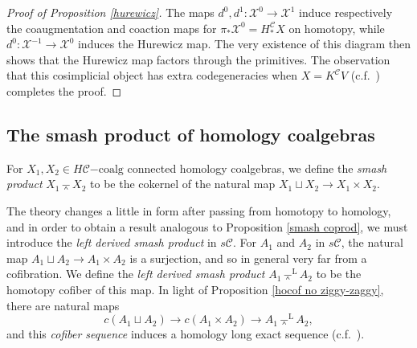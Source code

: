 \documentclass[11pt]{amsart} \renewcommand{\baselinestretch}{1.2}
\theoremstyle{plain}
\numberwithin{equation}{section} %
\theoremstyle{plain}
\numberwithin{equation}{chapter} %
\renewcommand{\to}{\longrightarrow}
\newcommand{\from}{\longleftarrow}
\newcommand{\calx}{\mathcal{X}}
\newcommand{\calc}{\mathcal{C}}
\newcommand{\citeBOX}[2][]{\cite[\mbox{#1}]{#2}}
\newcommand{\HC}[1]{H#1\mathrm{-coalg}}
\newcommand{\smashprod}{\barwedge}%
\newcommand{\Lsmashprod}{\barwedge^\mathrm{L}}%
\newcommand{\SubsectionOrSection}[1]{\subsection{#1}}
\begin{document}
\begin{Pi-algebras and cohomology algebras}
\begin{proof}[Proof of Proposition \ref{hurewicz}]
The maps $d^0,d^1:\calx^{0}\to\calx^{1}$ induce respectively the coaugmentation and coaction maps for $\pi_*\calx^{0}=H_*^{\calc}X$ on homotopy, while $d^0:\calx^{-1}\to\calx^{0}$ induces the Hurewicz map. The very existence of this diagram then shows that the  Hurewicz map factors through the primitives. The  observation   that this cosimplicial object has extra codegeneracies  when $X=K^\calc V$     (c.f.\ \citeBOX[\S4]{BlumRiehlResolutions.pdf}) completes the proof.
\end{proof}

\SubsectionOrSection{The smash product of homology coalgebras}\label{subseq:The smash product}
For $X_1,X_2\in \HC{\calc}$ connected homology coalgebras, we define the \emph{smash product} $X_1\smashprod X_2$ to be the cokernel of the natural map $X_1\sqcup X_2\to X_1\times X_2$. 

The theory changes a little in form after passing from homotopy to homology, and in order to obtain a result analogous to Proposition \ref{smash coprod}, we must introduce the \emph{left derived smash product} in $s\calc$. For $A_1$ and $A_2$ in $s\calc$, the natural map $A_1\sqcup A_2\to A_1\times A_2$ is a surjection, and so in general very far from a cofibration. We define the \emph{left derived smash product} $A_1\Lsmashprod A_2$ to be the homotopy cofiber of this map.
In light of Proposition \ref{hocof no ziggy-zaggy}, there are natural maps
\[c(A_1\sqcup A_2)\to c(A_1\times A_2)\to A_1\Lsmashprod A_2,\]
and this \emph{cofiber sequence} induces  a homology long exact sequence (c.f.\ \cite[Proposition 4.6]{MR1089001}).
%
%


\end{Pi-algebras and cohomology algebras}
\end{document}

